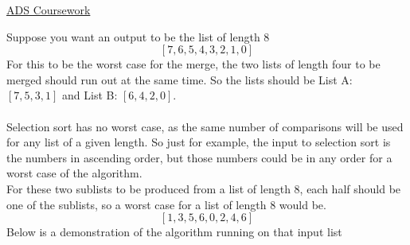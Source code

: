\documentclass{article}[18pt]
\begin{document}
\begin{center}
\underline{\huge ADS Coursework}
\end{center}
Suppose you want an output to be the list of length 8
$$[7,6,5,4,3,2,1,0]$$
For this to be the worst case for the merge, the two lists of length four to be merged should run out at the same time. So the lists should be List A: $[7,5,3,1]$ and List B: $[6,4,2,0]$.\\
\\
Selection sort has no worst case, as the same number of comparisons will be used for any list of a given length. So just for example, the input to selection sort is the numbers in ascending order, but those numbers could be in any order for a worst case of the algorithm.
\\
For these two sublists to be produced from a list of length 8, each half should be one of the sublists, so a worst case for a list of length 8 would be.
$$[1,3,5,6,0,2,4,6]$$
Below is a demonstration of the algorithm running on that input list
\begin{center}


\end{center}
\end{document}
